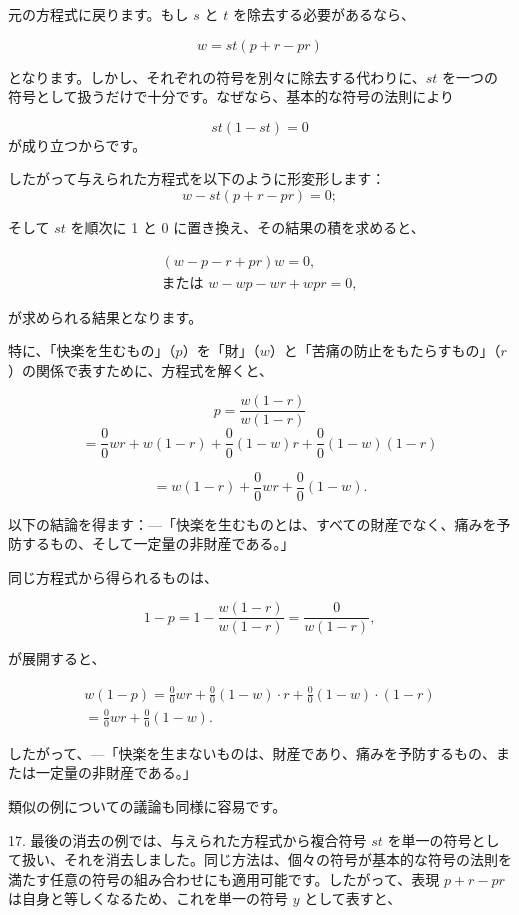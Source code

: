 \documentclass[a4paper,11pt,openany]{ltjsbook}
\begin{document}
元の方程式に戻ります。もし $s$ と $t$ を除去する必要があるなら、

\[
w=st(p+r-pr)
\]

となります。しかし、それぞれの符号を別々に除去する代わりに、$st$ を一つの符号として扱うだけで十分です。なぜなら、基本的な符号の法則により

\[
st (1 - st) = 0
\]
が成り立つからです。

したがって与えられた方程式を以下のように形変形します：
\[
w - st (p + r - pr) = 0;
\]

そして $st$ を順次に 1 と 0 に置き換え、その結果の積を求めると、

\begin{eqnarray*}
(w - p - r + pr) w = 0,\\
\textrm{または }  w - wp - wr + wpr = 0,
\end{eqnarray*}

が求められる結果となります。

特に、「快楽を生むもの」（$p$）を「財」（$w$）と「苦痛の防止をもたらすもの」（$r$）の関係で表すために、方程式を解くと、

\[
p = \frac{w(1-r)}{w(1-r)}
\]
\[
= \frac{0}{0}wr + w(1 - r) + \frac{0}{0}(1 - w)r + \frac{0}{0} (1 - w) (1 - r)
\]

\[
= w(1 - r) + \frac{0}{0}wr + \frac{0}{0}(1 - w).
\]

以下の結論を得ます：—「快楽を生むものとは、すべての財産でなく、痛みを予防するもの、そして一定量の非財産である。」

同じ方程式から得られるものは、

\[
1-p = 1 - \frac{w(1-r)}{w(1-r)} = \frac{0}{w(1-r)},
\]

が展開すると、

\begin{eqnarray*}
w(1-p)
= \frac{0}{0}wr + \frac{0}{0}(1-w) \cdot r + \frac{0}{0}(1-w) \cdot (1-r)\\
= \frac{0}{0}wr + \frac{0}{0}(1-w).
\end{eqnarray*}

したがって、—「快楽を生まないものは、財産であり、痛みを予防するもの、または一定量の非財産である。」

類似の例についての議論も同様に容易です。

17. 最後の消去の例では、与えられた方程式から複合符号 $st$ を単一の符号として扱い、それを消去しました。同じ方法は、個々の符号が基本的な符号の法則を満たす任意の符号の組み合わせにも適用可能です。したがって、表現 $p + r - pr$ は自身と等しくなるため、これを単一の符号 $y$ として表すと、
\end{document}
